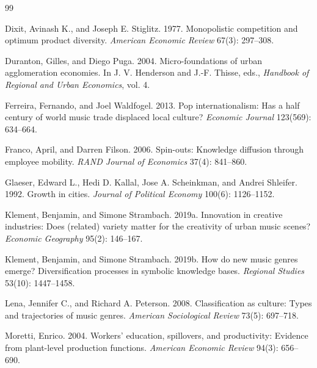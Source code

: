 \begin{thebibliography}{99}

Dixit, Avinash K., and Joseph E. Stiglitz. 1977.
\newblock Monopolistic competition and optimum product diversity.
\newblock \emph{American Economic Review} 67(3): 297--308.

Duranton, Gilles, and Diego Puga. 2004.
\newblock Micro-foundations of urban agglomeration economies.
\newblock In J. V. Henderson and J.-F. Thisse, eds., \emph{Handbook of Regional and Urban Economics}, vol. 4.

Ferreira, Fernando, and Joel Waldfogel. 2013.
\newblock Pop internationalism: Has a half century of world music trade displaced local culture?
\newblock \emph{Economic Journal} 123(569): 634--664.

Franco, April, and Darren Filson. 2006.
\newblock Spin-outs: Knowledge diffusion through employee mobility.
\newblock \emph{RAND Journal of Economics} 37(4): 841--860.

Glaeser, Edward L., Hedi D. Kallal, Jose A. Scheinkman, and Andrei Shleifer. 1992.
\newblock Growth in cities.
\newblock \emph{Journal of Political Economy} 100(6): 1126--1152.

Klement, Benjamin, and Simone Strambach. 2019a.
\newblock Innovation in creative industries: Does (related) variety matter for the creativity of urban music scenes?
\newblock \emph{Economic Geography} 95(2): 146--167.

Klement, Benjamin, and Simone Strambach. 2019b.
\newblock How do new music genres emerge? Diversification processes in symbolic knowledge bases.
\newblock \emph{Regional Studies} 53(10): 1447--1458.

Lena, Jennifer C., and Richard A. Peterson. 2008.
\newblock Classification as culture: Types and trajectories of music genres.
\newblock \emph{American Sociological Review} 73(5): 697--718.

Moretti, Enrico. 2004.
\newblock Workers' education, spillovers, and productivity: Evidence from plant-level production functions.
\newblock \emph{American Economic Review} 94(3): 656--690.


\end{thebibliography}
